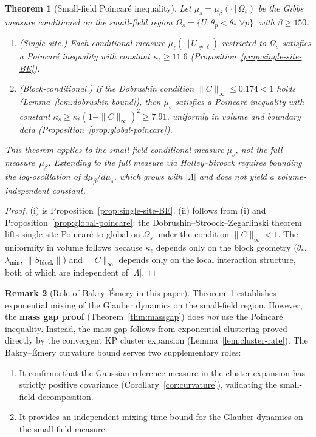 \documentclass[11pt]{article}
\newtheorem{theorem}{Theorem}[section]
\theoremstyle{definition}
\newtheorem{remark}[theorem]{Remark}
\begin{document}
\begin{theorem}[Small-field Poincar\'e inequality]\label{thm:poincare}
Let $\mu_s=\mu_\beta(\cdot\,|\,\Omega_s)$ be the Gibbs measure
conditioned on the small-field region
$\Omega_s=\{U:\theta_p<\theta_*\;\forall p\}$, with $\beta\ge 150$.
\begin{enumerate}[nosep,label=(\roman*)]
\item \emph{(Single-site.)}  Each conditional measure
$\mu_\ell(\cdot\,|\,U_{\neq\ell})$ restricted to $\Omega_s$
satisfies a Poincar\'e inequality with constant
$\kappa_\ell\ge 11.6$
(Proposition~\ref{prop:single-site-BE}).
\item \emph{(Block-conditional.)}  If the Dobrushin condition
$\|C\|_\infty\le 0.174<1$ holds
(Lemma~\ref{lem:dobrushin-bound}), then
$\mu_s$ satisfies a Poincar\'e inequality with constant
$\kappa_s\ge\kappa_\ell(1-\|C\|_\infty)^2\ge 7.91$,
uniformly in volume and boundary data
(Proposition~\ref{prop:global-poincare}).
\end{enumerate}
This theorem applies to the small-field conditional measure
$\mu_s$, not the full measure~$\mu_\beta$.  Extending to the
full measure via Holley--Stroock requires bounding the
log-oscillation of $d\mu_\beta/d\mu_s$, which grows with
$|\Lambda|$ and does not yield a volume-independent constant.
\end{theorem}

\begin{proof}
(i) is Proposition~\ref{prop:single-site-BE}.  (ii) follows from
(i) and Proposition~\ref{prop:global-poincare}: the
Dobrushin--Stroock--Zegarlinski theorem~\cite{StroockZegarlinski}
lifts single-site Poincar\'e to global on $\Omega_s$ under the
condition $\|C\|_\infty<1$.  The uniformity in volume follows
because $\kappa_\ell$ depends only on the block geometry
($\theta_*$, $\lambda_{\min}$, $\|S_{\mathrm{block}}\|$) and
$\|C\|_\infty$ depends only on the local interaction structure,
both of which are independent of $|\Lambda|$.
\end{proof}

\begin{remark}[Role of Bakry--\'Emery in this paper]%
\label{rem:BE-role}
Theorem~\ref{thm:poincare} establishes exponential mixing
of the Glauber dynamics on the small-field region.  However,
the \textbf{mass gap proof} (Theorem~\ref{thm:massgap}) does
\emph{not} use the Poincar\'e inequality.  Instead, the mass
gap follows from exponential clustering proved directly by the
convergent KP cluster expansion
(Lemma~\ref{lem:cluster-rate}).  The Bakry--\'Emery curvature
bound serves two supplementary roles:
\begin{enumerate}[nosep]
\item It confirms that the Gaussian reference measure in the
  cluster expansion has strictly positive covariance
  (Corollary~\ref{cor:curvature}), validating the small-field
  decomposition.
\item It provides an independent mixing-time bound for the
  Glauber dynamics on the small-field measure.
\end{enumerate}
\end{remark}
\end{document}
